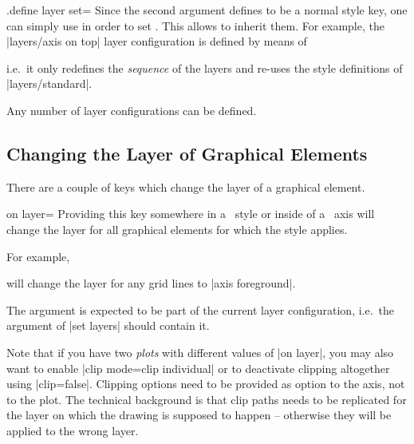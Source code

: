 \begin{handler}{{.define layer set}=}
    Since the second argument  defines  to be a normal style key, one can simply use  in order to set . This allows to inherit them. For example, the |layers/axis on top| layer configuration is defined by means of
\begin{codeexample}
\end{codeexample}
    \noindent i.e.\ it only redefines the \emph{sequence} of the layers and re-uses the style definitions of |layers/standard|.

    Any number of layer configurations can be defined. 
\end{handler}


\subsection{Changing the Layer of Graphical Elements}
There are a couple of keys which change the layer of a graphical element. 

\begin{pgfplotskey}{on layer=}
    Providing this key somewhere in a \PGFPlots\ style or inside of a \PGFPlots\ axis will change the layer for all graphical elements for which the style applies.

    For example,
    \noindent will change the layer for any grid lines to |axis foreground|.

    The argument  is expected to be part of the current layer configuration, i.e.\ the argument of |set layers| should contain it.

	Note that if you have two \emph{plots} with different values of |on layer|, you may also want to enable |clip mode=clip individual| or to deactivate clipping altogether using |clip=false|. Clipping options need to be provided as option to the axis, not to the plot. The technical background is that clip paths needs to be replicated for the layer on which the drawing is supposed to happen -- otherwise they will be applied to the wrong layer.
\end{pgfplotskey}

